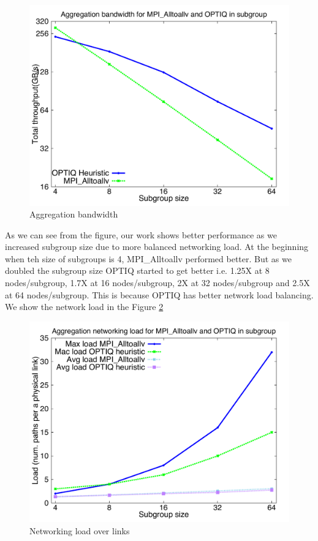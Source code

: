 \begin{figure}[!htb]
\vspace{-0.1in}
\centering
\includegraphics[scale=0.30]{figures/agg.pdf}
\vspace{-0.1in}
\caption{Aggregation bandwidth}
\vspace{-0.1in}
\label{fig:aggbw}
\end{figure}

As we can see from the figure, our work shows better performance as we increased subgroup size due to more balanced networking load. At the beginning when teh size of subgroups is 4, MPI\_Alltoallv performed better. But as we doubled the subgroup size OPTIQ started to get better i.e. 1.25X at 8 nodes/subgroup, 1.7X at 16 nodes/subgroup, 2X at 32 nodes/subgroup and 2.5X at 64 nodes/subgroup. This is because OPTIQ has better network load balancing. We show the network load in the Figure \ref{fig:aggload}

\begin{figure}[!htb]
\vspace{-0.1in}
\centering
\includegraphics[scale=0.30]{figures/load.pdf}
\vspace{-0.1in}
\caption{Networking load over links}
\vspace{-0.1in}
\label{fig:aggload}
\end{figure}

